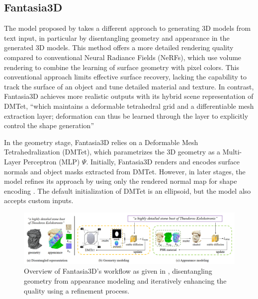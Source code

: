 \subsection{Fantasia3D}\label{fantasia3D}

The model proposed by \citeauthor{chen2023fantasia3d} takes a different approach to generating 3D models from text input, in particular by disentangling geometry and appearance in the generated 3D models.
This method offers a more detailed rendering quality compared to conventional Neural Radiance Fields (NeRFs), which use volume rendering to combine the learning of surface geometry with pixel colors. This conventional approach limits effective surface recovery, lacking the capability to track the surface of an object and tune detailed material and texture. In contrast, Fantasia3D achieves more realistic outputs with its hybrid scene representation of DMTet, ``which maintains a deformable tetrahedral grid and a differentiable mesh extraction layer; deformation can thus be learned through the layer to explicitly control the shape generation'' \citep{chen2023fantasia3d}

In the geometry stage, Fantasia3D relies on a Deformable Mesh Tetrahedralization (DMTet), which parametrizes the 3D geometry as a Multi-Layer Perceptron (MLP) \(\Psi\). Initially, Fantasia3D renders and encodes surface normals and object masks extracted from DMTet. However, in later stages, the model refines its approach by using only the rendered normal map for shape encoding \citep{chen2023fantasia3d}. The default initialization of DMTet is an ellipsoid, but the model also accepts custom inputs.

\begin{figure}[ht]
  \centering
    \includegraphics[width=1\columnwidth]{figures/models/Fantasia3D.png}
    \caption{Overview of Fantasia3D's workflow as given in \citep{chen2023fantasia3d}, disentangling geometry from appearance modeling and iteratively enhancing the quality using a refinement process.}\label{fig:figureFantasia}
\end{figure}

